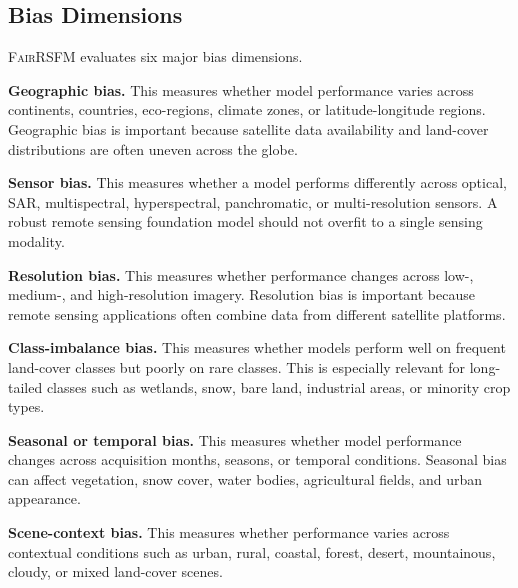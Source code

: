 \documentclass[10pt,twocolumn,letterpaper]{article}
\newcommand{\method}{\textsc{FairRSFM}\xspace}
\begin{document}
\subsection{Bias Dimensions}

\method evaluates six major bias dimensions.

\textbf{Geographic bias.}
This measures whether model performance varies across continents, countries, eco-regions, climate zones, or latitude-longitude regions. Geographic bias is important because satellite data availability and land-cover distributions are often uneven across the globe.

\textbf{Sensor bias.}
This measures whether a model performs differently across optical, SAR, multispectral, hyperspectral, panchromatic, or multi-resolution sensors. A robust remote sensing foundation model should not overfit to a single sensing modality.

\textbf{Resolution bias.}
This measures whether performance changes across low-, medium-, and high-resolution imagery. Resolution bias is important because remote sensing applications often combine data from different satellite platforms.

\textbf{Class-imbalance bias.}
This measures whether models perform well on frequent land-cover classes but poorly on rare classes. This is especially relevant for long-tailed classes such as wetlands, snow, bare land, industrial areas, or minority crop types.

\textbf{Seasonal or temporal bias.}
This measures whether model performance changes across acquisition months, seasons, or temporal conditions. Seasonal bias can affect vegetation, snow cover, water bodies, agricultural fields, and urban appearance.

\textbf{Scene-context bias.}
This measures whether performance varies across contextual conditions such as urban, rural, coastal, forest, desert, mountainous, cloudy, or mixed land-cover scenes.

\begin{table}[t]
\centering
\caption{Bias dimensions considered in \method.}
\label{tab:bias_dimensions}
\end{table}
\end{document}
